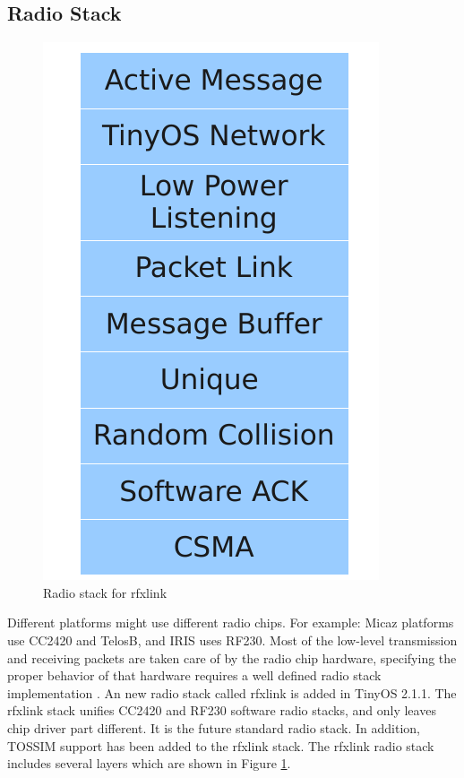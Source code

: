 \subsection{Radio Stack}
\label{Sim:radio stack}
\begin{figure}[htbp]
  \begin{center}
    \leavevmode
      \includegraphics[scale=0.5]{Pics/Rfxlinklayer.pdf}
   \caption{Radio stack for rfxlink}
    \label{fig:rfxlinklayer}
  \end{center}
\end{figure}
Different platforms might use different radio chips. For example: Micaz platforms use CC2420 and TelosB, and IRIS uses RF230. Most of the low-level transmission and receiving packets are taken care of by the radio chip hardware, specifying the proper behavior of that hardware requires a well defined radio stack implementation \cite{TEP 126}. 
An new radio stack called rfxlink is added in TinyOS 2.1.1. The rfxlink stack unifies CC2420 and RF230 software radio stacks, and only leaves chip driver part different. It is the future standard radio stack. In addition, TOSSIM support has been added to the rfxlink stack.
The rfxlink radio stack includes several layers which are shown in Figure \ref{fig:rfxlinklayer}. 
